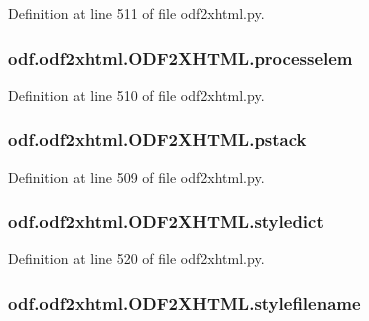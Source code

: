 Definition at line 511 of file odf2xhtml.\+py.

\hypertarget{classodf_1_1odf2xhtml_1_1ODF2XHTML_a2c49e30dd5748171bcb695393989191f}{
\subsubsection[{processelem}]{\setlength{\rightskip}{0pt plus 5cm}odf.\+odf2xhtml.\+O\+D\+F2\+X\+H\+T\+M\+L.\+processelem}}\label{classodf_1_1odf2xhtml_1_1ODF2XHTML_a2c49e30dd5748171bcb695393989191f}


Definition at line 510 of file odf2xhtml.\+py.

\hypertarget{classodf_1_1odf2xhtml_1_1ODF2XHTML_ae0d89428e18dc8851d750d041829b200}{
\subsubsection[{pstack}]{\setlength{\rightskip}{0pt plus 5cm}odf.\+odf2xhtml.\+O\+D\+F2\+X\+H\+T\+M\+L.\+pstack}}\label{classodf_1_1odf2xhtml_1_1ODF2XHTML_ae0d89428e18dc8851d750d041829b200}


Definition at line 509 of file odf2xhtml.\+py.

\hypertarget{classodf_1_1odf2xhtml_1_1ODF2XHTML_a4b62c330ad474bfc40c4c926fc9cd0c3}{
\subsubsection[{styledict}]{\setlength{\rightskip}{0pt plus 5cm}odf.\+odf2xhtml.\+O\+D\+F2\+X\+H\+T\+M\+L.\+styledict}}\label{classodf_1_1odf2xhtml_1_1ODF2XHTML_a4b62c330ad474bfc40c4c926fc9cd0c3}


Definition at line 520 of file odf2xhtml.\+py.

\hypertarget{classodf_1_1odf2xhtml_1_1ODF2XHTML_acf4575c8d15a8191a0f208af3edae66d}{
\subsubsection[{stylefilename}]{\setlength{\rightskip}{0pt plus 5cm}odf.\+odf2xhtml.\+O\+D\+F2\+X\+H\+T\+M\+L.\+stylefilename}}\label{classodf_1_1odf2xhtml_1_1ODF2XHTML_acf4575c8d15a8191a0f208af3edae66d}


